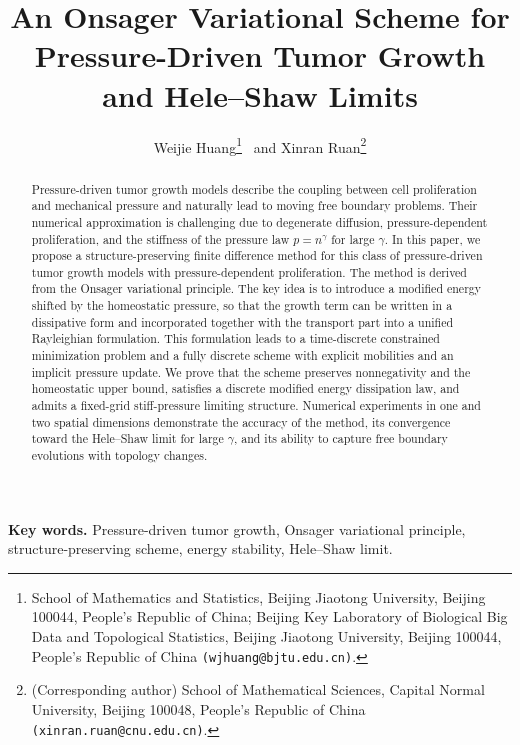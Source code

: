 \documentclass[11pt]{article}
\theoremstyle{plain}
\numberwithin{equation}{section}
\begin{document}
\title{An Onsager Variational Scheme for Pressure-Driven Tumor Growth and Hele–Shaw Limits}

\author{
Weijie Huang\thanks{School of Mathematics and Statistics, Beijing Jiaotong University, Beijing 100044, People's Republic of China; Beijing Key Laboratory of Biological Big Data and Topological Statistics, Beijing Jiaotong University, Beijing 100044, People's Republic of China  {\tt (wjhuang@bjtu.edu.cn)}.} \ and
Xinran Ruan\thanks{(Corresponding author) School of Mathematical Sciences, Capital Normal University, Beijing 100048, People's Republic of China {\tt (xinran.ruan@cnu.edu.cn)}.}
}

\date{}
\maketitle

\begin{abstract}
Pressure-driven tumor growth models describe the coupling between cell proliferation and mechanical pressure and naturally lead to moving free boundary problems. Their numerical approximation is challenging due to degenerate diffusion, pressure-dependent proliferation, and the stiffness of the pressure law \(p=n^\gamma\) for large \(\gamma\). In this paper, we propose a structure-preserving finite difference method for this class of pressure-driven tumor growth models with pressure-dependent proliferation. The method is derived from the Onsager variational principle. The key idea is to introduce a modified energy shifted by the homeostatic pressure, so that the growth term can be written in a dissipative form and incorporated together with the transport part into a unified Rayleighian formulation. This formulation leads to a time-discrete constrained minimization problem and a fully discrete scheme with explicit mobilities and an implicit pressure update. We prove that the scheme preserves nonnegativity and the homeostatic upper bound, satisfies a discrete modified energy dissipation law, and admits a fixed-grid stiff-pressure limiting structure. Numerical experiments in one and two spatial dimensions demonstrate the accuracy of the method, its convergence toward the Hele--Shaw limit for large \(\gamma\), and its ability to capture free boundary evolutions with topology changes.

\end{abstract}

{\bf Key words.} Pressure-driven tumor growth, Onsager variational principle, structure-preserving scheme, energy stability, Hele--Shaw limit.
\end{document}
